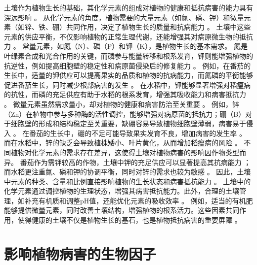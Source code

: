 \documentclass[AutoFakeBold]{LZUThesis-PgD&PhD}
\begin{document}
	土壤作为植物生长的基础，其化学元素的组成对植物的健康和抵抗病害的能力具有深远影响 \cite{marschner2012mineral}。  
	从化学元素的角度，植物需要的大量元素（如氮、磷、钾）和微量元素（如锌、铁、硼）共同作用，决定了植物生长的质量和抗病能力 \cite{bashir2020role}。  
	土壤中这些元素的供应平衡，不仅影响植物的正常生理代谢，还能增强其对病原微生物的抵抗力 \cite{rengel2003role}。  
	常量元素，如氮（N）、磷（P）和钾（K），是植物生长的基本需求。  
	氮是叶绿素合成和光合作用的关键，而磷参与能量转移和根系发育，钾则能增强植物的抗逆性，例如提高细胞壁的稳定性和病原菌侵染后的修复能力 \cite{liu2019effects}。  
	例如，在番茄的生长中，适量的钾供应可以提高果实的品质和植物的抗病能力，而氮磷的平衡能够促进番茄生长，同时减少根部病害的发生 \cite{zhao2014effect}。  
	在水稻中，钾能够显著增强对稻瘟病的抗性，而磷的充足供应有助于水稻的根系发育，增强其吸收能力和病害抵抗力 \cite{shahzad2020impact}。  
	微量元素虽然需求量小，却对植物的健康和病害防治至关重要 \cite{bashir2020role}。  
	例如，锌（Zn）在植物中参与多种酶的活性调控，能够增强对病原菌的抵抗力；硼（B）对于细胞壁的形成和结构稳定至关重要，缺硼容易导致植物细胞壁薄弱，病害易于侵入 \cite{rengel2003role}。  
	在番茄的生长中，硼的不足可能导致果实发育不良，增加病害的发生率 \cite{zhao2014effect}。  
	而在水稻中，锌的缺乏会导致植株矮小、叶片黄化，从而增加稻瘟病的风险 \cite{liu2019effects}。  
	不同植物对化学元素的需求存在差异，这使得土壤对植物病害的影响因作物类型而异。  
	番茄作为需钾较高的作物，土壤中钾的充足供应可以显著提高其抗病能力 \cite{zhao2014effect}；  
	而水稻更注重氮、磷和钾的协调平衡，同时对锌的需求也较为敏感 \cite{shahzad2020impact}。  
	因此，土壤中元素的种类、含量和比例直接影响植物的生长状态和病害抵抗能力 \cite{marschner2012mineral}。  
	土壤中的化学元素通过调控植物的生理状态，增强其病害抵抗能力。此外，合理的土壤管理，如补充有机质和调整pH值，还能优化元素的吸收效率 \cite{rengel2003role}。  
	例如，适当的有机肥能够提供微量元素，同时改善土壤结构，增强植物的根系活力。这些因素共同作用，使得健康的土壤不仅是植物生长的基石，也是植物抵抗病害的重要屏障 \cite{bashir2020role}。

	\section{影响植物病害的生物因子}
	
\end{document}
